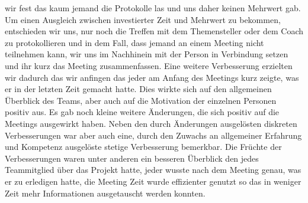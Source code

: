 \documentclass{article}
\begin{document}
wir fest das kaum jemand die Protokolle las und uns daher keinen Mehrwert gab. Um einen Ausgleich zwischen 
investierter Zeit und Mehrwert zu bekommen, entschieden wir uns, nur noch die Treffen mit dem Themensteller oder dem Coach
zu protokollieren und in dem Fall, dass jemand an einem Meeting nicht teilnehmen kann, wir uns im Nachhinein mit der 
Person in Verbindung setzen und ihr kurz das Meeting zusammenfassen. Eine weitere Verbesserung erzielten wir dadurch
das wir anfingen das jeder am Anfang des Meetings kurz zeigte, was er in der letzten Zeit gemacht hatte.
Dies wirkte sich auf den allgemeinen Überblick des Teams, aber auch auf die Motivation der einzelnen Personen positiv aus.
Es gab noch kleine weitere Änderungen, die sich positiv auf die Meetings ausgewirkt haben. Neben den 
durch Änderungen ausgelösten diskreten Verbesserungen war aber auch eine, durch den Zuwachs an allgemeiner 
Erfahrung und Kompetenz ausgelöste stetige Verbesserung bemerkbar. Die Früchte der Verbesserungen waren unter anderen 
ein besseren Überblick den jedes Teammitglied über das Projekt hatte, jeder wusste nach dem Meeting genau, was er 
zu erledigen hatte, die Meeting Zeit wurde effizienter genutzt so das in weniger Zeit
mehr Informationen ausgetauscht werden konnten.
\par
\medskip
\end{document}
